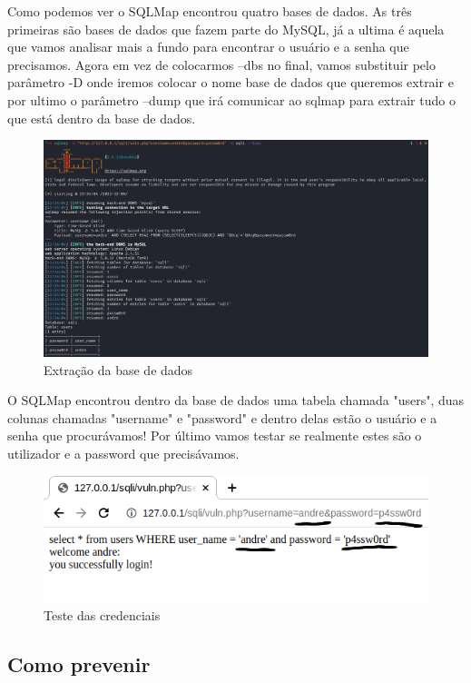 \documentclass{report}
\begin{document}
Como podemos ver o SQLMap encontrou quatro bases de dados. As três primeiras são bases de dados que fazem parte do MySQL, já a ultima é aquela que vamos analisar mais a fundo para encontrar o usuário e a senha que precisamos. Agora em vez de colocarmos --dbs no final, vamos substituir pelo parâmetro -D onde iremos colocar o nome base de dados que queremos extrair e por ultimo o parâmetro --dump que irá comunicar ao sqlmap para extrair tudo o que está dentro da base de dados.
\clearpage
\begin{figure}[h]
 \centering
 \includegraphics[scale=0.27]{imagessql/Fig6.png}
 \caption{Extração da base de dados}\label{extração da base de dados}
\end{figure}  

O SQLMap encontrou dentro da base de dados uma tabela chamada "users", duas colunas chamadas "user\textunderscore name" e "password" e dentro delas estão o usuário e a senha que procurávamos! Por último vamos testar se realmente estes são o utilizador e a password que precisávamos.


\begin{figure}[h]
 \centering
 \includegraphics[scale=0.7]{imagessql/Fig7.png}
 \caption{Teste das credenciais}\label{teste das credenciais}
\end{figure}  
\clearpage

\subsection{Como prevenir}
\end{document}
